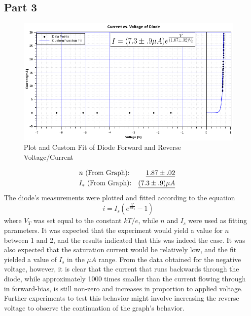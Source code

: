 \documentclass[twocolumn,english]{IEEEtran}
\theoremstyle{plain}
\theoremstyle{plain}
\begin{document}
\noindent\hrulefill
\subsection*{Part 3}
  \begin{figure}[H]
  \begin{centering}
  \begin{center}
  \includegraphics[width=\linewidth]{./part3graph.png}
  \caption{Plot and Custom Fit of Diode Forward and Reverse Voltage/Current}
  \label{fig:graph_part3}
  \end{center}
  \par\end{centering}
  \end{figure}
\appendices{}
  \begin{align*}
  &\text{$n$ (From Graph):} 					&\text{\underline{$1.87\pm.02$} } 	\\
  &\text{$I_s$ (From Graph):} 					&\text{\underline{$(7.3 \pm .9) \mu A$} }	\\
  \end{align*}
  The diode's measurements were plotted and fitted according to the equation
  \begin{equation}
   i = I_s\left(e^{\frac{V}{nV_t}}-1\right)
  \end{equation}
  where $V_T$ was set equal to the constant $kT/e$, while $n$ and $I_s$ were used as fitting parameters. It was expected that the experiment would yield a value for $n$ between 1 and 2, and the results indicated that this was indeed the case. It was also expected that the saturation current would be relatively low, and the fit yielded a value of $I_s$ in the $\mu A$ range. From the data obtained for the negative voltage, however, it is clear that the current that runs backwards through the diode, while approximately 1000 times smaller than the current flowing through in forward-bias, is still non-zero and increases in proportion to applied voltage. Further experiments to test this behavior might involve increasing the reverse voltage to observe the continuation of the graph's behavior.


%
%
\end{document}
